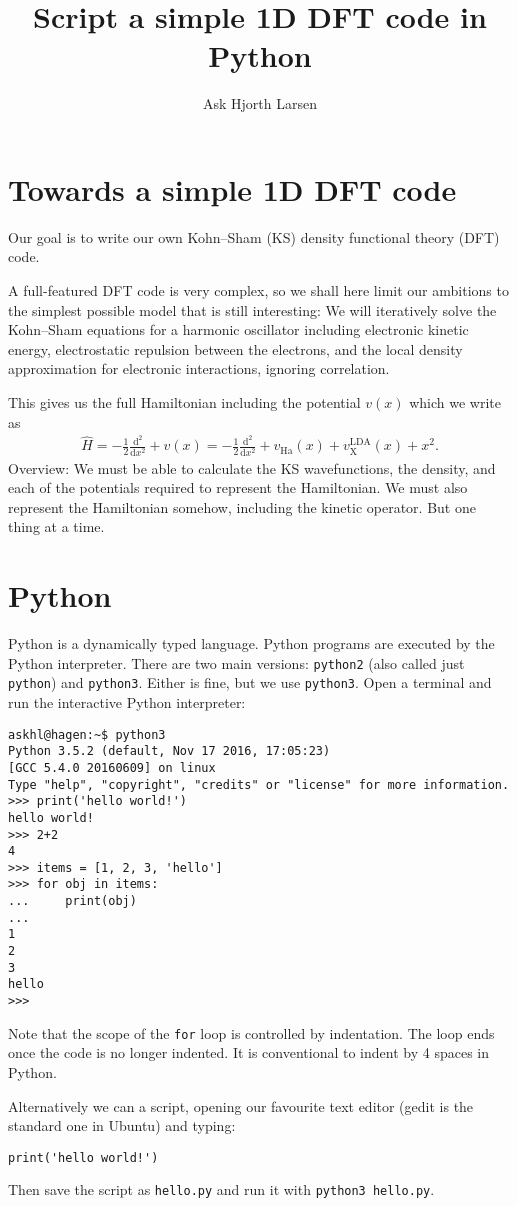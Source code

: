 \documentclass{article}
\title{Script a simple 1D DFT code in Python}
\author{Ask Hjorth Larsen}
\newcommand{\dee}[0]{\mathrm d}
\newcommand{\diff}[2]{\frac{\dee #1}{\dee #2}}
\newcommand{\Ha}[0]{\mathrm{Ha}}
\begin{document}
\section{Towards a simple 1D DFT code}

Our goal is to write our own Kohn--Sham (KS) density functional theory
(DFT) code.

A full-featured DFT code is very complex, so we shall here limit our ambitions
to the simplest possible model that is still interesting:
We will iteratively solve the Kohn--Sham
equations for a harmonic oscillator including electronic kinetic
energy, electrostatic repulsion between the electrons, and the
local density approximation for electronic interactions, ignoring correlation.

This gives us the full Hamiltonian including the potential $v(x)$
which we write as
\begin{align}
\hat H = -\frac12 \diff{^2}{x^2} + v(x) = -\frac12 \diff{^2}{x^2} + v_\Ha(x) + v_{\mathrm X}^{\mathrm{LDA}}(x) + x^2.
\end{align}
Overview: We must be able to calculate the KS wavefunctions, the
density, and each of the potentials required to represent the
Hamiltonian.  We must also represent the Hamiltonian somehow,
including the kinetic operator.  But one thing at a time.

\section{Python}
Python is a dynamically typed language.  Python programs are executed
by the Python interpreter.
There are two main versions:
\texttt{python2} (also called just \texttt{python}) and \texttt{python3}.
Either is fine, but we use \texttt{python3}.
Open a terminal and
run the interactive Python interpreter:

\begin{verbatim}
askhl@hagen:~$ python3
Python 3.5.2 (default, Nov 17 2016, 17:05:23)
[GCC 5.4.0 20160609] on linux
Type "help", "copyright", "credits" or "license" for more information.
>>> print('hello world!')
hello world!
>>> 2+2
4
>>> items = [1, 2, 3, 'hello']
>>> for obj in items:
...     print(obj)
...
1
2
3
hello
>>>
\end{verbatim}
Note that the scope of the \texttt{for} loop is controlled by indentation.
The loop ends once the code is no longer indented.
It is conventional to indent by 4 spaces in Python.

Alternatively we can a script, opening our favourite text editor (gedit is the standard one in Ubuntu) and typing:
\begin{lstlisting}
print('hello world!')
\end{lstlisting}
Then save the script as \texttt{hello.py} and run it with
\texttt{python3 hello.py}.
\end{document}
